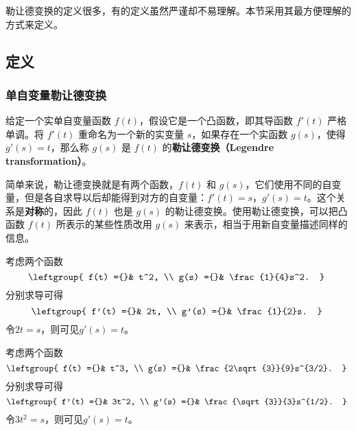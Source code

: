 

勒让德变换的定义很多，有的定义虽然严谨却不易理解。本节采用其最方便理解的方式来定义。

\subsection{定义}

\subsubsection{单自变量勒让德变换}
\begin{definition}{}
给定一个实单自变量函数 $f(t)$，假设它是一个凸函数，即其导函数 $f'(t)$ 严格单调。将 $f'(t)$ 重命名为一个新的实变量 $s$，如果存在一个实函数 $g(s)$，使得 $g'(s)=t$，那么称 $g(s)$ 是 $f(t)$ 的\textbf{勒让德变换（Legendre transformation）}。
\end{definition}

简单来说，勒让德变换就是有两个函数，$f(t)$ 和 $g(s)$，它们使用不同的自变量，但是各自求导以后却能得到对方的自变量：$f'(t)=s$，$g'(s)=t$。这个关系是\textbf{对称}的，因此 $f(t)$ 也是 $g(s)$ 的勒让德变换。使用勒让德变换，可以把凸函数 $f(t)$ 所表示的某些性质改用 $g(s)$ 来表示，相当于用新自变量描述同样的信息。



\begin{example}{}\label{ex_TrLgdr_1}
考虑两个函数
\begin{equation}
\leftgroup{
    f(t) ={}& t^2, \\
    g(s) ={}& \frac{1}{4}s^2. 
}~
\end{equation}
分别求导可得
\begin{equation}
\leftgroup{
    f'(t) ={}& 2t, \\
    g'(s) ={}& \frac{1}{2}s. 
}~
\end{equation}
令$2t=s$，则可见$g'(s)=t$。
\end{example}



\begin{example}{}\label{ex_TrLgdr_2}
考虑两个函数
\begin{equation}
\leftgroup{
    f(t) ={}& t^3, \\
    g(s) ={}& \frac{2\sqrt{3}}{9}s^{3/2}. 
}~
\end{equation}
分别求导可得
\begin{equation}
\leftgroup{
    f'(t) ={}& 3t^2, \\
    g'(s) ={}& \frac{\sqrt{3}}{3}s^{1/2}. 
}~
\end{equation}
令$3t^2=s$，则可见$g'(s)=t$。
\end{example}




